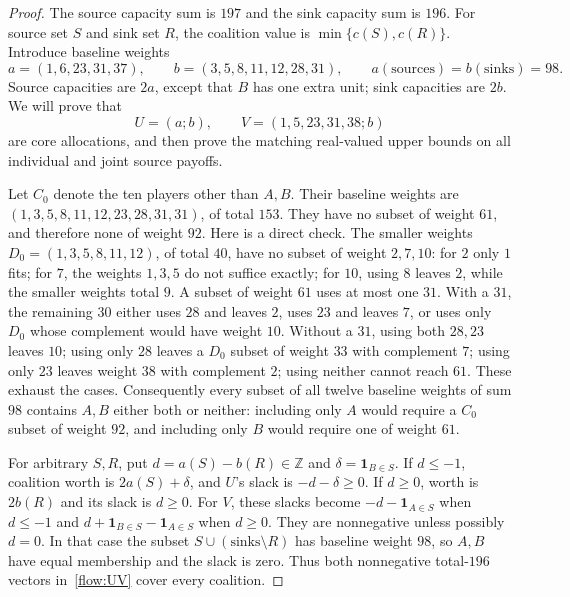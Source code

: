 \documentclass[11pt]{article}
\theoremstyle{remark}
\begin{document}
\begin{proof}
The source capacity sum is $197$ and the sink capacity sum is $196$.
For source set $S$ and sink set $R$, the coalition value is
$\min\{c(S),c(R)\}$. Introduce baseline weights
\[
 a=(1,6,23,31,37),\qquad b=(3,5,8,11,12,28,31),
                  \qquad a(\mathrm{sources})=b(\mathrm{sinks})=98.
\]
Source capacities are $2a$, except that $B$ has one extra unit; sink
capacities are $2b$. We will prove that
\begin{equation}\label{flow:UV}
         U=(a;b),\qquad V=(1,5,23,31,38;b)
\end{equation}
are core allocations, and then prove the matching real-valued upper
bounds on all individual and joint source payoffs.

Let $C_0$ denote the ten players other than $A,B$. Their baseline
weights are $(1,3,5,8,11,12,23,28,31,31)$, of total $153$.
They have no subset of weight $61$, and therefore none of weight $92$.
Here is a direct check. The smaller weights
$D_0=(1,3,5,8,11,12)$, of total $40$, have no subset of weight
$2,7,10$: for $2$ only $1$ fits; for $7$, the weights $1,3,5$ do
not suffice exactly; for $10$, using $8$ leaves $2$, while the smaller
weights total $9$. A subset of weight $61$ uses at most one $31$.
With a $31$, the remaining $30$ either uses $28$ and leaves $2$, uses
$23$ and leaves $7$, or uses only $D_0$ whose complement would have
weight $10$. Without a $31$, using both $28,23$ leaves $10$; using
only $28$ leaves a $D_0$ subset of weight $33$ with complement $7$;
using only $23$ leaves weight $38$ with complement $2$; using neither
cannot reach $61$. These exhaust the cases. Consequently every subset
of all twelve baseline weights of sum $98$ contains $A,B$ either both
or neither: including only $A$ would require a $C_0$ subset of weight
$92$, and including only $B$ would require one of weight $61$.

For arbitrary $S,R$, put $d=a(S)-b(R)\in\mathbb Z$ and
$\delta=\mathbf1_{B\in S}$. If $d\le-1$, coalition worth is
$2a(S)+\delta$, and $U$'s slack is $-d-\delta\ge0$.
If $d\ge0$, worth is $2b(R)$ and its slack is $d\ge0$.
For $V$, these slacks become $-d-\mathbf1_{A\in S}$ when $d\le-1$
and $d+\mathbf1_{B\in S}-\mathbf1_{A\in S}$ when $d\ge0$.
They are nonnegative unless possibly $d=0$. In that case the subset
$S\cup(\mathrm{sinks}\setminus R)$ has baseline weight $98$,
so $A,B$ have equal membership and the slack is zero.
Thus both nonnegative total-$196$ vectors in~\eqref{flow:UV} cover
every coalition.


\end{proof}
\end{document}
